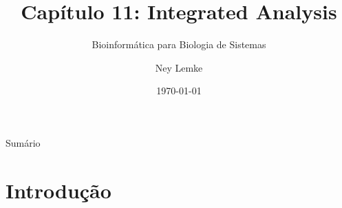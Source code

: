 


\title[Cap. 11: Integrated Analysis]{Capítulo 11: Integrated Analysis}
\subtitle{Bioinformática para Biologia de Sistemas}
\author{Ney Lemke}
\date{\today}



\begin{frame}
\titlepage
\end{frame}

\begin{frame}{Sumário}
\tableofcontents
\end{frame}

\section{Introdução}

